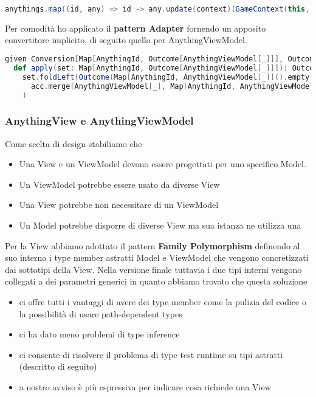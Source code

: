 \begin{lstlisting}[language=Scala]
anythings.map((id, any) => id -> any.update(context)(GameContext(this, character)))
\end{lstlisting}

Per comodità ho applicato il \textbf{pattern Adapter} fornendo un apposito convertitore implicito, di seguito quello per AnythingViewModel.

\begin{lstlisting}[language=Scala]
given Conversion[Map[AnythingId, Outcome[AnythingViewModel[_]]], Outcome[Map[AnythingId, AnythingViewModel[_]]]] with
  def apply(set: Map[AnythingId, Outcome[AnythingViewModel[_]]]): Outcome[Map[AnythingId, AnythingViewModel[_]]] =
    set.foldLeft(Outcome(Map[AnythingId, AnythingViewModel[_]]().empty))((acc, el) =>
      acc.merge[AnythingViewModel[_], Map[AnythingId, AnythingViewModel[_]]](el._2)((set, el2) => set + (el._1 -> el2))
    )
\end{lstlisting}

\subsubsection{AnythingView e AnythingViewModel}
Come scelta di design stabiliamo che 
\begin{itemize}
    \item Una View e un ViewModel devono essere progettati per uno specifico Model. 
    \item Un ViewModel potrebbe essere usato da diverse View
    \item Una View potrebbe non necessitare di un ViewModel
    \item Un Model potrebbe disporre di diverse View ma sua istanza ne utilizza una
\end{itemize}
Per la View abbiamo adottato il pattern \textbf{Family Polymorphism} definendo al suo interno i type member astratti Model e ViewModel che vengono concretizzati dai sottotipi della View.
Nella versione finale tuttavia i due tipi interni vengono collegati a dei parametri generici in quanto abbiamo trovato che questa soluzione
\begin{itemize}
    \item ci offre tutti i vantaggi di avere dei type member come la pulizia del codice o la possibilità di usare path-dependent types
    \item ci ha dato meno problemi di type inference 
    \item ci consente di risolvere il problema di type test runtime su tipi astratti (descritto di seguito)
    \item a nostro avviso è più espressiva per indicare cosa richiede una View
\end{itemize}

